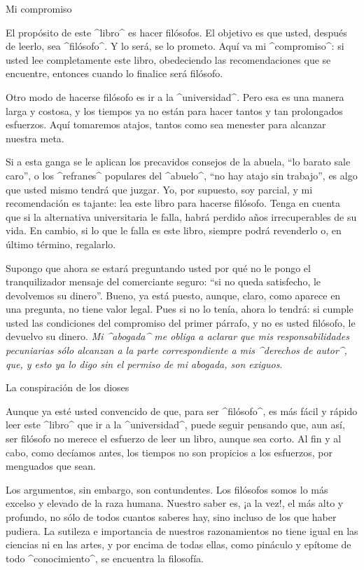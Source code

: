 

\Section Mi compromiso

El propósito de este ^libro^ es hacer filósofos. El objetivo es que
usted, después de leerlo, sea ^filósofo^. Y lo será, se lo prometo. Aquí
va mi ^compromiso^: si usted lee completamente este libro, obedeciendo
las recomendaciones que se encuentre, entonces cuando lo finalice será
filósofo.

Otro modo de hacerse filósofo es ir a la ^universidad^. Pero esa es una
manera larga y costosa, y los tiempos ya no están para hacer tantos y
tan prolongados esfuerzos. Aquí tomaremos atajos, tantos como sea
menester para alcanzar nuestra meta.

Si a esta ganga se le aplican los precavidos consejos de la abuela, ``lo
barato sale caro'', o los ^refranes^ populares del ^abuelo^, ``no hay
atajo sin trabajo'', es algo que usted mismo tendrá que juzgar. Yo, por
supuesto, soy parcial, y mi recomendación es tajante: lea este libro
para hacerse filósofo. Tenga en cuenta que si la alternativa
universitaria le falla, habrá perdido años irrecuperables de su vida. En
cambio, si lo que le falla es este libro, siempre podrá revenderlo o, en
último término, regalarlo.

Supongo que ahora se estará preguntando usted por qué no le pongo el
tranquilizador mensaje del comerciante seguro: ``si no queda satisfecho,
le devolvemos su dinero''. Bueno, ya está puesto, aunque, claro, como
aparece en una pregunta, no tiene valor legal. Pues si no lo tenía,
ahora lo tendrá: si cumple usted las condiciones del compromiso del
primer párrafo, y no es usted filósofo, le devuelvo su dinero. {\it Mi
^abogada^ me obliga a aclarar que mis responsabilidades pecuniarias sólo
alcanzan a la parte correspondiente a mis ^derechos de autor^, que, y
esto ya lo digo sin el permiso de mi abogada, son exiguos}.


\Section La conspiración de los dioses

Aunque ya esté usted convencido de que, para ser ^filósofo^, es más
fácil y rápido leer este ^libro^ que ir a la ^universidad^, puede seguir
pensando que, aun así, ser filósofo no merece el esfuerzo de leer un
libro, aunque sea corto. Al fin y al cabo, como decíamos antes, los
tiempos no son propicios a los esfuerzos, por menguados que sean.

Los argumentos, sin embargo, son contundentes. Los filósofos somos lo
más excelso y elevado de la raza humana. Nuestro saber es, ¡a la vez!,
el más alto y profundo, no sólo de todos cuantos saberes hay, sino
incluso de los que haber pudiera. La sutileza e importancia de nuestros
razonamientos no tiene igual en las ciencias ni en las artes, y por
encima de todas ellas, como pináculo y epítome de todo ^conocimiento^,
se encuentra la filosofía.

